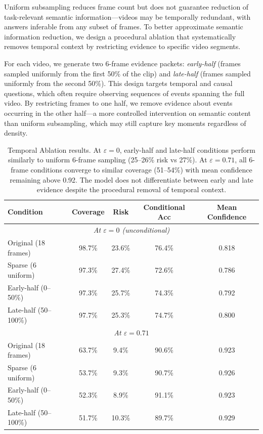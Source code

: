 \documentclass{article}
\begin{document}
Uniform subsampling reduces frame count but does not guarantee reduction of task-relevant semantic information---videos may be temporally redundant, with answers inferable from any subset of frames. To better approximate semantic information reduction, we design a procedural ablation that systematically removes temporal context by restricting evidence to specific video segments.

For each video, we generate two 6-frame evidence packets: \emph{early-half} (frames sampled uniformly from the first 50\% of the clip) and \emph{late-half} (frames sampled uniformly from the second 50\%). This design targets temporal and causal questions, which often require observing sequences of events spanning the full video. By restricting frames to one half, we remove evidence about events occurring in the other half---a more controlled intervention on semantic content than uniform subsampling, which may still capture key moments regardless of density.

\begin{table}[h]
\centering
\small
\begin{tabular}{lcccc}
\toprule
Condition & Coverage & Risk & Conditional Acc & Mean Confidence \\
\midrule
\multicolumn{5}{c}{\textit{At $\varepsilon = 0$ (unconditional)}} \\
Original (18 frames) & 98.7\% & 23.6\% & 76.4\% & 0.818 \\
Sparse (6 uniform) & 97.3\% & 27.4\% & 72.6\% & 0.786 \\
Early-half (0--50\%) & 97.3\% & 25.7\% & 74.3\% & 0.792 \\
Late-half (50--100\%) & 97.7\% & 25.3\% & 74.7\% & 0.800 \\
\midrule
\multicolumn{5}{c}{\textit{At $\varepsilon = 0.71$}} \\
Original (18 frames) & 63.7\% & 9.4\% & 90.6\% & 0.923 \\
Sparse (6 uniform) & 53.7\% & 9.3\% & 90.7\% & 0.926 \\
Early-half (0--50\%) & 52.3\% & 8.9\% & 91.1\% & 0.923 \\
Late-half (50--100\%) & 51.7\% & 10.3\% & 89.7\% & 0.929 \\
\bottomrule
\end{tabular}
\caption{\small Temporal Ablation results. At $\varepsilon=0$, early-half and late-half conditions perform similarly to uniform 6-frame sampling (25--26\% risk vs 27\%). At $\varepsilon=0.71$, all 6-frame conditions converge to similar coverage (51--54\%) with mean confidence remaining above 0.92. The model does not differentiate between early and late evidence despite the procedural removal of temporal context.}
\label{tab:halfclip}
\end{table}
\end{document}

